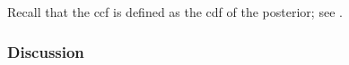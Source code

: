 %

%



%

%


Recall that the \gls{ccf} is defined as the \gls{cdf} of the posterior; see .
%




%

%


%

%



%
\subsubsection{Discussion}
%
